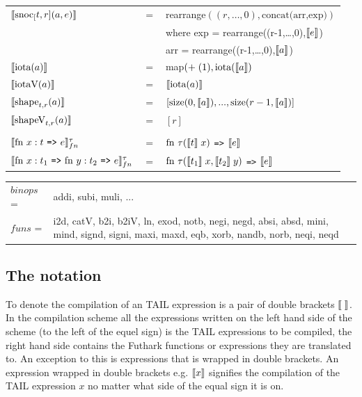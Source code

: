 \documentclass[11pt]{article}
\begin{document}
\begin{flushleft}
\begin{tabular}{@{}l c l}
$\llbracket \text{snoc}_[t,r](a,e) \rrbracket$ & $=$ & rearrange$((r,\ldots,0), \text{concat(arr,exp)})$\\
&& \hspace{4ex} where exp = rearrange((r-1,\ldots,0),$\llbracket e \rrbracket$)\\
&& \hspace{4ex} \phantom{where} arr = rearrange((r-1,\ldots,0),$\llbracket a \rrbracket$)\\

$\llbracket \text{iota}(a) \rrbracket$ & $=$ & map$(+ \; (1), \text{iota}(\llbracket a \rrbracket)$\\

$\llbracket \text{iotaV}(a) \rrbracket$ & $=$ & $\llbracket \text{iota}(a) \rrbracket$\\

$\llbracket \text{shape}_{t,r}(a) \rrbracket$ & $=$ & $[\text{size}(0,\llbracket a \rrbracket),...,\text{size}(r-1,\llbracket a \rrbracket)]$\\

$\llbracket \text{shapeV}_{t,r}(a) \rrbracket$ & $=$ & $[r]$\\
\\

$\evals{ \text{fn } x:t $ {\tt =>} $ e}^{\tau}_{fn} $ & $=$ & $ \text{fn } \tau (\llbracket t \rrbracket\; x) $ {\tt =>} $ \llbracket e \rrbracket$\\
$\evals{ \text{fn } x:t_1$ {\tt =>} $\text{fn } y:t_2 $ {\tt =>} $ e}^{\tau}_{fn} $ & $=$ & $ \text{fn } \tau (\llbracket t_1 \rrbracket\; x, \llbracket t_2 \rrbracket \; y) $ {\tt =>} $ \llbracket e \rrbracket$\\

\end{tabular}
\begin{tabu} to \linewidth { l X}
$binops$ =& addi, subi, muli, ...\\
$funs$ =& i2d, catV, b2i, b2iV, ln, exod, notb, negi, negd, absi, absd, mini, mind, signd, signi, maxi, maxd, eqb, xorb,
nandb, norb, neqi, neqd
\end{tabu}
\end{flushleft}

\subsection{The notation}
To denote the compilation of an TAIL expression is a pair of double brackets $\llbracket  \;  \rrbracket$. 
In the compilation scheme all the expressions written on the left hand side of the scheme (to the left of the equel sign) is the TAIL expressions to be compiled, the right hand side contains the Futhark functions or expressions they are translated to. An exception to this is expressions that is wrapped in double brackets.
An expression wrapped in double brackets e.g. $\llbracket x \rrbracket$ signifies the compilation of the TAIL expression $x$ no matter what side of the equal sign it is on.\\
\end{document}
